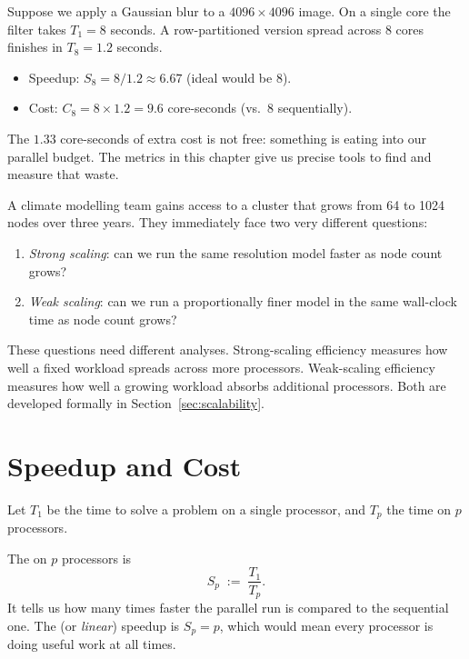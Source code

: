 \begin{ppexample}
Suppose we apply a Gaussian blur to a $4096 \times 4096$ image.
On a single core the filter takes $T_1 = 8$ seconds.
A row-partitioned version spread across 8 cores finishes in $T_8 = 1.2$
seconds.
\begin{itemize}
  \item Speedup: $S_8 = 8/1.2 \approx 6.67$ (ideal would be $8$).
  \item Cost: $C_8 = 8 \times 1.2 = 9.6$ core-seconds (vs.\ $8$ sequentially).
\end{itemize}
The $1.33$ core-seconds of extra cost is not free: something is eating into
our parallel budget.
The metrics in this chapter give us precise tools to find and measure that
waste.
\end{ppexample}

\begin{ppexample}
A climate modelling team gains access to a cluster that grows from 64 to
1024 nodes over three years.
They immediately face two very different questions:
\begin{enumerate}
  \item \emph{Strong scaling}: can we run the same resolution model faster as
        node count grows?
  \item \emph{Weak scaling}: can we run a proportionally finer model in the
        same wall-clock time as node count grows?
\end{enumerate}
These questions need different analyses.
Strong-scaling efficiency measures how well a fixed workload spreads across
more processors.
Weak-scaling efficiency measures how well a growing workload absorbs
additional processors.
Both are developed formally in Section~\ref{sec:scalability}.
\end{ppexample}

\section{Speedup and Cost}

Let $T_1$ be the time to solve a problem on a single processor, and $T_p$
the time on $p$ processors.

\begin{ppdefn}
The  on $p$ processors is
\[
  S_p \;:=\; \frac{T_1}{T_p}.
\]
It tells us how many times faster the parallel run is compared to the
sequential one.
The  (or \emph{linear}) speedup is $S_p = p$, which would
mean every processor is doing useful work at all times.
\end{ppdefn}


